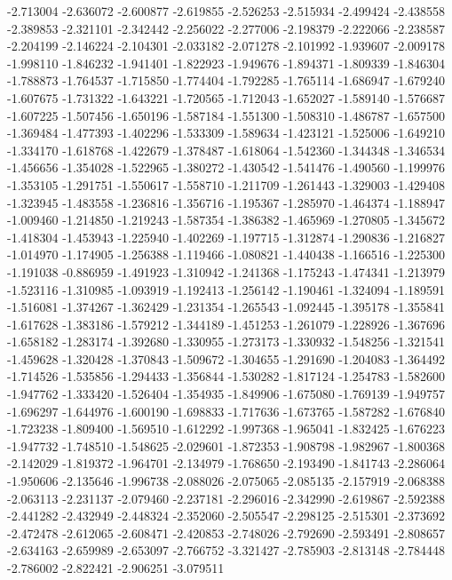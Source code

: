 -2.713004
-2.636072
-2.600877
-2.619855
-2.526253
-2.515934
-2.499424
-2.438558
-2.389853
-2.321101
-2.342442
-2.256022
-2.277006
-2.198379
-2.222066
-2.238587
-2.204199
-2.146224
-2.104301
-2.033182
-2.071278
-2.101992
-1.939607
-2.009178
-1.998110
-1.846232
-1.941401
-1.822923
-1.949676
-1.894371
-1.809339
-1.846304
-1.788873
-1.764537
-1.715850
-1.774404
-1.792285
-1.765114
-1.686947
-1.679240
-1.607675
-1.731322
-1.643221
-1.720565
-1.712043
-1.652027
-1.589140
-1.576687
-1.607225
-1.507456
-1.650196
-1.587184
-1.551300
-1.508310
-1.486787
-1.657500
-1.369484
-1.477393
-1.402296
-1.533309
-1.589634
-1.423121
-1.525006
-1.649210
-1.334170
-1.618768
-1.422679
-1.378487
-1.618064
-1.542360
-1.344348
-1.346534
-1.456656
-1.354028
-1.522965
-1.380272
-1.430542
-1.541476
-1.490560
-1.199976
-1.353105
-1.291751
-1.550617
-1.558710
-1.211709
-1.261443
-1.329003
-1.429408
-1.323945
-1.483558
-1.236816
-1.356716
-1.195367
-1.285970
-1.464374
-1.188947
-1.009460
-1.214850
-1.219243
-1.587354
-1.386382
-1.465969
-1.270805
-1.345672
-1.418304
-1.453943
-1.225940
-1.402269
-1.197715
-1.312874
-1.290836
-1.216827
-1.014970
-1.174905
-1.256388
-1.119466
-1.080821
-1.440438
-1.166516
-1.225300
-1.191038
-0.886959
-1.491923
-1.310942
-1.241368
-1.175243
-1.474341
-1.213979
-1.523116
-1.310985
-1.093919
-1.192413
-1.256142
-1.190461
-1.324094
-1.189591
-1.516081
-1.374267
-1.362429
-1.231354
-1.265543
-1.092445
-1.395178
-1.355841
-1.617628
-1.383186
-1.579212
-1.344189
-1.451253
-1.261079
-1.228926
-1.367696
-1.658182
-1.283174
-1.392680
-1.330955
-1.273173
-1.330932
-1.548256
-1.321541
-1.459628
-1.320428
-1.370843
-1.509672
-1.304655
-1.291690
-1.204083
-1.364492
-1.714526
-1.535856
-1.294433
-1.356844
-1.530282
-1.817124
-1.254783
-1.582600
-1.947762
-1.333420
-1.526404
-1.354935
-1.849906
-1.675080
-1.769139
-1.949757
-1.696297
-1.644976
-1.600190
-1.698833
-1.717636
-1.673765
-1.587282
-1.676840
-1.723238
-1.809400
-1.569510
-1.612292
-1.997368
-1.965041
-1.832425
-1.676223
-1.947732
-1.748510
-1.548625
-2.029601
-1.872353
-1.908798
-1.982967
-1.800368
-2.142029
-1.819372
-1.964701
-2.134979
-1.768650
-2.193490
-1.841743
-2.286064
-1.950606
-2.135646
-1.996738
-2.088026
-2.075065
-2.085135
-2.157919
-2.068388
-2.063113
-2.231137
-2.079460
-2.237181
-2.296016
-2.342990
-2.619867
-2.592388
-2.441282
-2.432949
-2.448324
-2.352060
-2.505547
-2.298125
-2.515301
-2.373692
-2.472478
-2.612065
-2.608471
-2.420853
-2.748026
-2.792690
-2.593491
-2.808657
-2.634163
-2.659989
-2.653097
-2.766752
-3.321427
-2.785903
-2.813148
-2.784448
-2.786002
-2.822421
-2.906251
-3.079511
